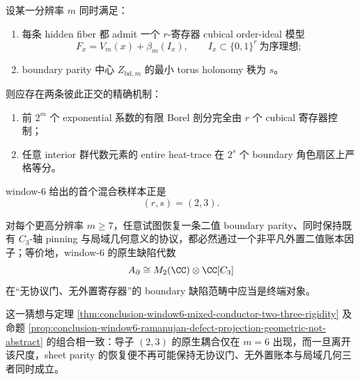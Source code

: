 \begin{conjecture}\label{conj:conclusion-window6-cubical-borel-toral-heat-dichotomy}
设某一分辨率 \(m\) 同时满足：
\begin{enumerate}
  \item 每条 hidden fiber 都 admit 一个 \(r\)-寄存器 cubical order-ideal 模型
  \[
  F_x=V_m(x)+\beta_m(I_x),
  \qquad
  I_x\subset\{0,1\}^r\ \text{为序理想};
  \]
  \item boundary parity 中心 \(Z_{\mathrm{bd},m}\) 的最小 torus holonomy 秩为 \(s\)。
\end{enumerate}
则应存在两条彼此正交的精确机制：
\begin{enumerate}
  \item 前 \(2^m\) 个 exponential 系数的有限 Borel 剖分完全由 \(r\) 个 cubical 寄存器控制；
  \item 任意 interior 群代数元素的 entire heat-trace 在 \(2^s\) 个 boundary 角色扇区上严格等分。
\end{enumerate}
window-\(6\) 给出的首个混合秩样本正是
\[
(r,s)=(2,3).
\]
\end{conjecture}

\begin{conjecture}\label{conj:conclusion-window6-ramanujan-clifford-native-terminality}
对每个更高分辨率 \(m\ge 7\)，任意试图恢复一条二值 boundary parity、同时保持既有 \(C_3\)-轴 pinning 与局域几何意义的协议，都必然通过一个非平凡外置二值账本因子；等价地，window-\(6\) 的原生缺陷代数
\[
A_{\partial}\cong M_2(\CC)\otimes \CC[C_3]
\]
在“无协议门、无外置寄存器”的 boundary 缺陷范畴中应当是终端对象。
\end{conjecture}

这一猜想与定理 \ref{thm:conclusion-window6-mixed-conductor-two-three-rigidity} 及命题 \ref{prop:conclusion-window6-ramanujan-defect-projection-geometric-not-abstract} 的组合相一致：导子 \((2,3)\) 的原生耦合仅在 \(m=6\) 出现，而一旦离开该尺度，sheet parity 的恢复便不再可能保持无协议门、无外置账本与局域几何三者同时成立。
